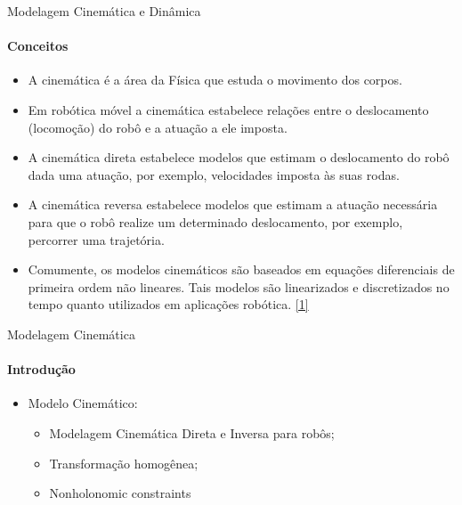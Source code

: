\documentclass{beamer}
\begin{document}
\begin{frame}{Modelagem Cinemática e Dinâmica}
    \framesubtitle{Conceitos}
    \begin{itemize}
        \item A cinemática é a área da Física que estuda o movimento dos corpos.
        \item Em robótica móvel a cinemática estabelece relações entre o deslocamento
              (locomoção) do robô e a atuação a ele imposta.
        \item A cinemática direta estabelece modelos que estimam o deslocamento do robô
              dada uma atuação, por exemplo, velocidades imposta às suas rodas.
        \item A cinemática reversa estabelece modelos que estimam a atuação necessária
              para que o robô realize um determinado deslocamento, por exemplo, percorrer
              uma trajetória.
        \item Comumente, os modelos cinemáticos são baseados em equações diferenciais
              de primeira ordem não lineares. Tais modelos são linearizados e discretizados
              no tempo quanto utilizados em aplicações robótica. \href{http://143.106.148.168:9080/Cursos/IA368N/01-16/cinematica2.pdf}{[1]}
    \end{itemize}
\end{frame}


\begin{frame}{Modelagem Cinemática}
    \framesubtitle{Introdução}
    \setlength\extrarowheight{5pt}
    \begin{itemize}
        \item Modelo Cinemático:
              \begin{itemize}
                  \item Modelagem Cinemática Direta e Inversa para robôs;
                  \item Transformação homogênea;
                  \item Nonholonomic constraints
              \end{itemize}
    \end{itemize}
\end{frame}
\end{document}
